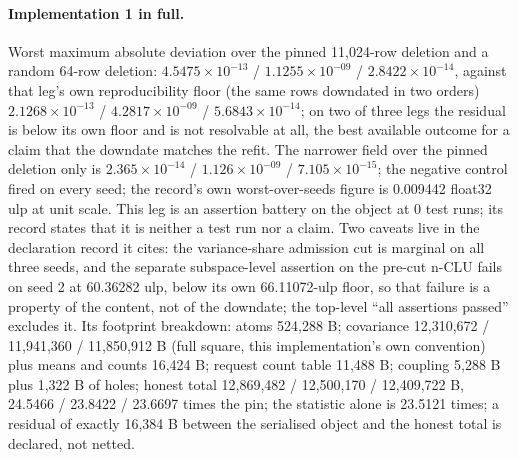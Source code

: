 \documentclass{article} %
\newcommand{\sci}[2]{\ensuremath{#1\times10^{#2}}}
\begin{document}
\paragraph{Implementation 1 in full.} Worst maximum absolute deviation over the pinned 11,024-row
deletion and a random 64-row deletion: \sci{4.5475}{-13} / \sci{1.1255}{-09} / \sci{2.8422}{-14},
against that leg's own reproducibility floor (the same rows downdated in two orders)
\sci{2.1268}{-13} / \sci{4.2817}{-09} / \sci{5.6843}{-14}; on two of three legs the residual is below
its own floor and is not resolvable at all, the best available outcome for a claim that the downdate matches the refit. The
narrower field over the pinned deletion only is \sci{2.365}{-14} / \sci{1.126}{-09} /
\sci{7.105}{-15}; the negative control fired on every seed; the record's own worst-over-seeds
figure is 0.009442 float32 ulp at unit scale. %
This leg is an assertion battery on the object at 0 test runs; its record states that it is neither a test
run nor a claim. Two caveats live in the declaration record it cites: the variance-share admission cut is
marginal on all three seeds, and the separate subspace-level assertion on the pre-cut n-CLU fails on
seed 2 at 60.36282 ulp, below its own 66.11072-ulp floor, so that failure is a property of the
content, not of the downdate; the top-level ``all assertions passed'' excludes it.
Its footprint breakdown: atoms 524,288 B; covariance 12,310,672 / 11,941,360 / 11,850,912 B (full
square, this implementation's own convention) plus means and counts 16,424 B; request count table
11,488 B; coupling 5,288 B plus 1,322 B of holes; honest total 12,869,482 / 12,500,170 / 12,409,722
B, 24.5466 / 23.8422 / 23.6697 times the pin; the statistic alone is 23.5121 times; a residual of %
exactly 16,384 B between the serialised object and the honest total is declared, not netted.
\end{document}
